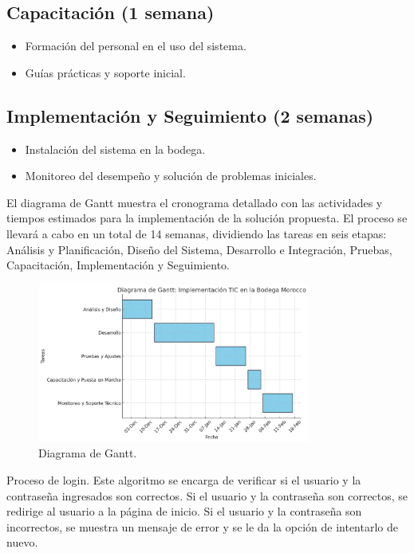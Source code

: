 \documentclass{article}
\begin{document}
\subsection{Capacitación (1 semana)}

    \begin{itemize}
      \item Formación del personal en el uso del sistema.
      \item Guías prácticas y soporte inicial.
    \end{itemize}


\subsection{Implementación y Seguimiento (2 semanas)}


    \begin{itemize}
      \item Instalación del sistema en la bodega.
      \item Monitoreo del desempeño y solución de problemas iniciales.
    \end{itemize}

\newpage

El diagrama de Gantt muestra el cronograma detallado con las actividades y tiempos estimados para la implementación de la solución propuesta. El proceso se llevará a cabo en un total de 14 semanas, dividiendo las tareas en seis etapas: Análisis y Planificación, Diseño del Sistema, Desarrollo e Integración, Pruebas, Capacitación, Implementación y Seguimiento.
\begin{figure}[H]
  \centering
  \includegraphics[width=0.8\textwidth]{./assets/gantt.jpeg}
  \caption{Diagrama de Gantt.}
\end{figure}

Proceso de login. Este algoritmo se encarga de verificar si el usuario y la contraseña ingresados son correctos. Si el usuario y la contraseña son correctos, se redirige al usuario a la página de inicio. Si el usuario y la contraseña son incorrectos, se muestra un mensaje de error y se le da la opción de intentarlo de nuevo.
\end{document}

